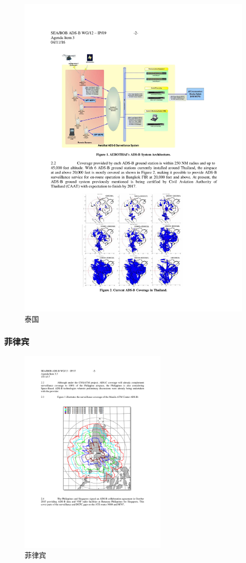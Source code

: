\begin{figure}[htbp]
\centering
\includegraphics[width=13cm]{pic/thailand.pdf}
\caption{泰国}
\label{fig:thailand}
\end{figure}

\subsubsection{菲律宾}

\begin{figure}[htbp]
\centering
\includegraphics[width=7cm]{pic/phillipine.pdf}
\caption{菲律宾}
\label{fig:phillipine}
\end{figure}



